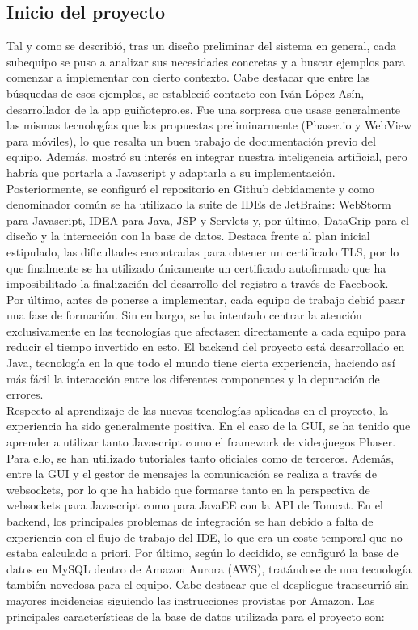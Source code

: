 \subsection{Inicio del proyecto}
\label{inicio}
Tal y como se describió, tras un diseño preliminar del sistema en general, cada subequipo se puso a analizar sus necesidades concretas y a buscar ejemplos para comenzar a implementar con cierto contexto. Cabe destacar que entre las búsquedas de esos ejemplos, se estableció contacto con Iván López Asín, desarrollador de la app guiñotepro.es. Fue una sorpresa que usase generalmente las mismas tecnologías que las propuestas preliminarmente (Phaser.io y WebView para móviles), lo que resalta un buen trabajo de documentación previo del equipo. Además, mostró su interés en integrar nuestra  inteligencia artificial, pero habría que portarla a Javascript y adaptarla a su implementación.\\

Posteriormente, se configuró el repositorio en Github debidamente y como denominador común se ha utilizado la suite de IDEs de JetBrains: WebStorm para Javascript, IDEA para Java, JSP y Servlets y, por último, DataGrip para el diseño y la interacción con la base de datos. Destaca frente al plan inicial estipulado, las dificultades encontradas para obtener un certificado TLS, por lo que finalmente se ha utilizado únicamente un certificado autofirmado que ha imposibilitado la finalización del desarrollo del registro a través de Facebook.\\

Por último, antes de ponerse a implementar, cada equipo de trabajo debió pasar una fase de formación. Sin embargo, se ha intentado centrar la atención exclusivamente en las tecnologías que afectasen directamente a cada equipo para reducir el tiempo invertido en esto. El backend del proyecto está desarrollado en Java, tecnología en la que todo el mundo tiene cierta experiencia, haciendo así más fácil la interacción entre los diferentes componentes y la depuración de errores.\\

Respecto al aprendizaje de las nuevas tecnologías aplicadas en el proyecto, la experiencia ha sido generalmente positiva. En el caso de la GUI, se ha tenido que aprender a utilizar tanto Javascript como el framework de videojuegos Phaser. Para ello, se han utilizado tutoriales tanto oficiales como de terceros. Además, entre la GUI y el gestor de mensajes la comunicación se realiza a través de websockets, por lo que ha habido que formarse tanto en la perspectiva de websockets para Javascript como para JavaEE con la API de Tomcat. En el backend, los principales problemas de integración se han debido a falta de experiencia con el flujo de trabajo del IDE, lo que era un coste temporal que no estaba calculado a priori. Por último, según lo decidido, se configuró la base de datos en MySQL dentro de Amazon Aurora (AWS), tratándose de una tecnología también novedosa para el equipo. Cabe destacar que el despliegue transcurrió sin mayores incidencias siguiendo las instrucciones provistas por Amazon. Las principales características de la base de datos utilizada para el proyecto son:

